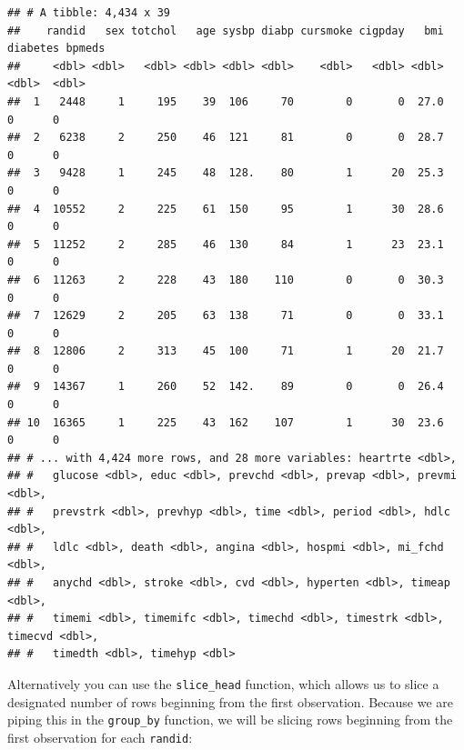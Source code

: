 \documentclass[
]{book}
\newenvironment{Shaded}{\begin{snugshade}}{\end{snugshade}}
\newcommand{\DataTypeTok}[1]{\textcolor[rgb]{0.13,0.29,0.53}{#1}}
\newcommand{\DecValTok}[1]{\textcolor[rgb]{0.00,0.00,0.81}{#1}}
\newcommand{\KeywordTok}[1]{\textcolor[rgb]{0.13,0.29,0.53}{\textbf{#1}}}
\newcommand{\NormalTok}[1]{#1}
\newcommand{\OperatorTok}[1]{\textcolor[rgb]{0.81,0.36,0.00}{\textbf{#1}}}
\newcommand{\StringTok}[1]{\textcolor[rgb]{0.31,0.60,0.02}{#1}}
\begin{document}
\begin{verbatim}
## # A tibble: 4,434 x 39
##    randid   sex totchol   age sysbp diabp cursmoke cigpday   bmi diabetes bpmeds
##     <dbl> <dbl>   <dbl> <dbl> <dbl> <dbl>    <dbl>   <dbl> <dbl>    <dbl>  <dbl>
##  1   2448     1     195    39  106     70        0       0  27.0        0      0
##  2   6238     2     250    46  121     81        0       0  28.7        0      0
##  3   9428     1     245    48  128.    80        1      20  25.3        0      0
##  4  10552     2     225    61  150     95        1      30  28.6        0      0
##  5  11252     2     285    46  130     84        1      23  23.1        0      0
##  6  11263     2     228    43  180    110        0       0  30.3        0      0
##  7  12629     2     205    63  138     71        0       0  33.1        0      0
##  8  12806     2     313    45  100     71        1      20  21.7        0      0
##  9  14367     1     260    52  142.    89        0       0  26.4        0      0
## 10  16365     1     225    43  162    107        1      30  23.6        0      0
## # ... with 4,424 more rows, and 28 more variables: heartrte <dbl>,
## #   glucose <dbl>, educ <dbl>, prevchd <dbl>, prevap <dbl>, prevmi <dbl>,
## #   prevstrk <dbl>, prevhyp <dbl>, time <dbl>, period <dbl>, hdlc <dbl>,
## #   ldlc <dbl>, death <dbl>, angina <dbl>, hospmi <dbl>, mi_fchd <dbl>,
## #   anychd <dbl>, stroke <dbl>, cvd <dbl>, hyperten <dbl>, timeap <dbl>,
## #   timemi <dbl>, timemifc <dbl>, timechd <dbl>, timestrk <dbl>, timecvd <dbl>,
## #   timedth <dbl>, timehyp <dbl>
\end{verbatim}

Alternatively you can use the \texttt{slice\_head} function, which allows us to slice a designated number of rows beginning from the first observation. Because we are piping this in the \texttt{group\_by} function, we will be slicing rows beginning from the first observation for each \texttt{randid}:

\begin{Shaded}
\end{Shaded}
\end{document}
